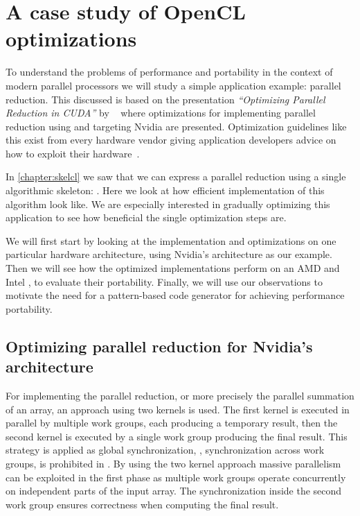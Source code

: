 \section{A case study of OpenCL optimizations}
To understand the problems of performance and portability in the context of modern parallel processors we will study a simple application example: parallel reduction.
This discussed is based on the presentation \emph{``Optimizing Parallel Reduction in CUDA''} by \citeauthor{Harris2007}~\cite{Harris2007} where optimizations for implementing parallel reduction using \CUDA and targeting Nvidia \GPUs are presented.
Optimization guidelines like this exist from every hardware vendor giving application developers advice on how to exploit their hardware~\cite{CUDAProgrammingGuide,AMDProgrammingGuide,IntelGPUProgrammingGuide,IntelXeonProgrammingGuide}.

In \autoref{chapter:skelcl} we saw that we can express a parallel reduction using a single algorithmic skeleton: \reduce.
Here we look at how efficient \OpenCL implementation of this algorithm look like.
We are especially interested in gradually optimizing this application to see how beneficial the single optimization steps are.

We will first start by looking at the implementation and optimizations on one particular hardware architecture, using Nvidia's \GPU architecture as our example.
Then we will see how the optimized implementations perform on an AMD \GPU and Intel \CPU, to evaluate their portability.
Finally, we will use our observations to motivate the need for a pattern-based code generator for achieving performance portability.


\subsection{Optimizing parallel reduction for Nvidia's \GPU architecture}
For implementing the parallel reduction, or more precisely the parallel summation of an array, an approach using two \OpenCL kernels is used.
The first \OpenCL kernel is executed in parallel by multiple \OpenCL work groups, each producing a temporary result, then the second \OpenCL kernel is executed by a single \OpenCL work group producing the final result.
This strategy is applied as global synchronization, \ie, synchronization across work groups, is prohibited in \OpenCL.
By using the two kernel approach massive parallelism can be exploited in the first phase as multiple work groups operate concurrently on independent parts of the input array.
The synchronization inside the second work group ensures correctness when computing the final result.

